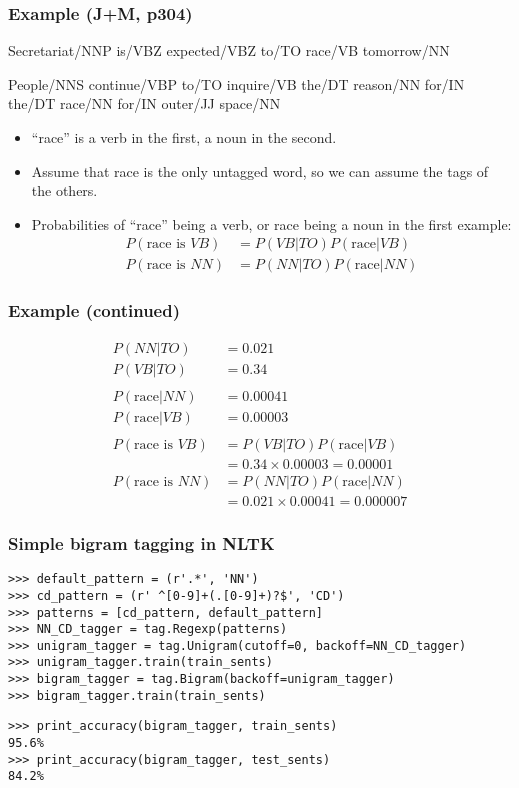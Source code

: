 \documentclass{beamer}
\begin{document}
\begin{frame}
  \frametitle{Example (J+M, p304)}
  {\small
  Secretariat/NNP is/VBZ expected/VBZ to/TO \alert{race/VB} tomorrow/NN

  \medskip
  People/NNS continue/VBP to/TO inquire/VB the/DT reason/NN for/IN the/DT
  \alert{race/NN} for/IN outer/JJ space/NN
  }

  \begin{itemize}
  \item<2-> ``race'' is a verb in the first, a noun in the second.
  \item<3-> Assume that race is the only untagged word, so we can assume
    the tags of the others.
  \item<4-> Probabilities of ``race'' being a verb, or race being a noun
    in the first example:
    \begin{align*}
      P(\mbox{race is }VB) &= P(VB|TO) P(\mbox{race}|VB) \\
      P(\mbox{race is }NN) &= P(NN|TO) P(\mbox{race}|NN) 
    \end{align*}
  \end{itemize}
\end{frame}

\begin{frame}
  \frametitle{Example (continued)}
  \begin{align*}
    P(NN|TO) &= 0.021 \\
    P(VB|TO) &= 0.34 \\
    \\
    P(\mbox{race}|NN) &= 0.00041\\
    P(\mbox{race}|VB) &= 0.00003\\
    \\
    P(\mbox{race is }VB) &= P(VB|TO) P(\mbox{race}|VB) \\
    &= 0.34 \times 0.00003 = 0.00001 \\
    P(\mbox{race is }NN) &= P(NN|TO) P(\mbox{race}|NN) \\
    &= 0.021 \times 0.00041 = 0.000007
   \end{align*}
\end{frame}

\begin{frame}[fragile]
  \frametitle{Simple bigram tagging in NLTK}
{\small
\begin{verbatim}
>>> default_pattern = (r'.*', 'NN')
>>> cd_pattern = (r' ^[0-9]+(.[0-9]+)?$', 'CD')
>>> patterns = [cd_pattern, default_pattern]
>>> NN_CD_tagger = tag.Regexp(patterns)
>>> unigram_tagger = tag.Unigram(cutoff=0, backoff=NN_CD_tagger)
>>> unigram_tagger.train(train_sents)
>>> bigram_tagger = tag.Bigram(backoff=unigram_tagger)
>>> bigram_tagger.train(train_sents)
\end{verbatim}%

\begin{verbatim}
>>> print_accuracy(bigram_tagger, train_sents)
95.6%
>>> print_accuracy(bigram_tagger, test_sents)
84.2%
\end{verbatim}
}
\end{frame}
\end{document}
